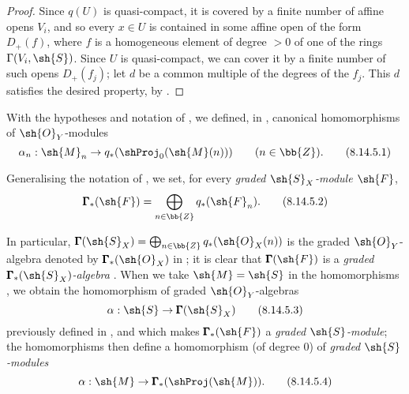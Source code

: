 \begin{proof}
\label{proof-II.8.14.4}
Since $q(U)$ is quasi-compact, it is covered by a finite number of affine opens $V_i$, and so every $x\in U$ is contained in some affine open of the form $D_+(f)$, where $f$ is a homogeneous element of degree $>0$ of one of the rings $\Gamma(V_i,\sh{S})$.
Since $U$ is quasi-compact, we can cover it by a finite number of such opens $D_+(f_j)$;
let $d$ be a common multiple of the degrees of the $f_j$.
This $d$ satisfies the desired property, by .
\end{proof}

\begin{env}[8.14.5]
\label{II.8.14.5}
With the hypotheses and notation of , we defined, in , canonical homomorphisms of $\sh{O}_Y$-modules
\[
\label{II.8.14.5.1}
    \alpha_n: \sh{M}_n \to q_*(\shProj_0(\sh{M}(n)))
    \qquad (n\in\bb{Z}).
\tag{8.14.5.1}
\]

Generalising the notation of , we set, for every \emph{graded $\sh{S}_X$-module $\sh{F}$},
\[
\label{II.8.14.5.2}
    \pmb{\Gamma}_*(\sh{F}) = \bigoplus_{n\in\bb{Z}}q_*(\sh{F}_n).
\tag{8.14.5.2}
\]

In particular, $\pmb{\Gamma}(\sh{S}_X)=\bigoplus_{n\in\bb{Z}}q_*(\sh{O}_X(n))$ is the graded $\sh{O}_Y$-algebra denoted by $\pmb{\Gamma}_*(\sh{O}_X)$ in ;
it is clear that $\pmb{\Gamma}(\sh{F})$ is a \emph{graded $\pmb{\Gamma}_*(\sh{S}_X)$-algebra} .
When
we take $\sh{M}=\sh{S}$ in the homomorphisms , we obtain the homomorphism of graded $\sh{O}_Y$-algebras
\[
\label{II.8.14.5.3}
    \alpha:\sh{S}\to\pmb{\Gamma}(\sh{S}_X)
\tag{8.14.5.3}
\]
previously defined in , and which makes $\pmb{\Gamma}_*(\sh{F})$ a \emph{graded $\sh{S}$-module};
the homomorphisms  then define a homomorphism (of degree $0$) of \emph{graded $\sh{S}$-modules}
\[
\label{II.8.14.5.4}
    \alpha:\sh{M}\to\pmb{\Gamma}_*(\shProj(\sh{M})).
\tag{8.14.5.4}
\]
\end{env}

\begin{env}[8.14.6]
\label{II.8.14.6}
\end{env}
